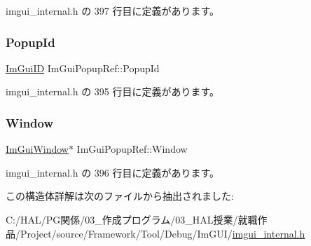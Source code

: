  imgui\+\_\+internal.\+h の 397 行目に定義があります。

\mbox{\label{struct_im_gui_popup_ref_a7037780575e28439414d28625a495bad}} 
\subsubsection{\texorpdfstring{Popup\+Id}{PopupId}}
{\footnotesize\ttfamily \mbox{\hyperlink{imgui_8h_a1785c9b6f4e16406764a85f32582236f}{Im\+Gui\+ID}} Im\+Gui\+Popup\+Ref\+::\+Popup\+Id}



 imgui\+\_\+internal.\+h の 395 行目に定義があります。

\mbox{\label{struct_im_gui_popup_ref_a471027209038d1d59280a84c8d236f34}} 
\subsubsection{\texorpdfstring{Window}{Window}}
{\footnotesize\ttfamily \mbox{\hyperlink{struct_im_gui_window}{Im\+Gui\+Window}}$\ast$ Im\+Gui\+Popup\+Ref\+::\+Window}



 imgui\+\_\+internal.\+h の 396 行目に定義があります。



この構造体詳解は次のファイルから抽出されました\+:\begin{DoxyCompactItemize}
\item 
C\+:/\+H\+A\+L/\+P\+G関係/03\+\_\+作成プログラム/03\+\_\+\+H\+A\+L授業/就職作品/\+Project/source/\+Framework/\+Tool/\+Debug/\+Im\+G\+U\+I/\mbox{\hyperlink{imgui__internal_8h}{imgui\+\_\+internal.\+h}}\end{DoxyCompactItemize}
